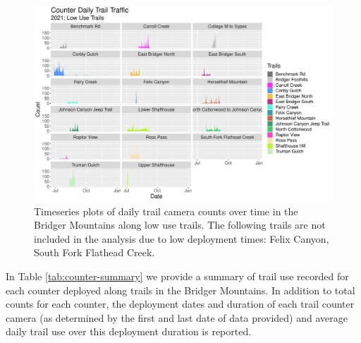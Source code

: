 \documentclass[
]{book}
\begin{document}
\begin{figure}

{\centering \includegraphics[width=1\linewidth]{../figures/Counter_bySubsection_TS_lowuse} 

}

\caption{Timeseries plots of daily trail camera counts over time in the Bridger Mountains along low use trails. The following trails are not included in the analysis due to low deployment times: Felix Canyon, South Fork Flathead Creek.}\label{fig:counter-byid-low}
\end{figure}

In Table \ref{tab:counter-summary} we provide a summary of trail use
recorded for each counter deployed along trails in the Bridger
Mountains. In addition to total counts for each counter, the deployment
dates and duration of each trail counter camera (as determined by the
first and last date of data provided) and average daily trail use over
this deployment duration is reported.
\end{document}
